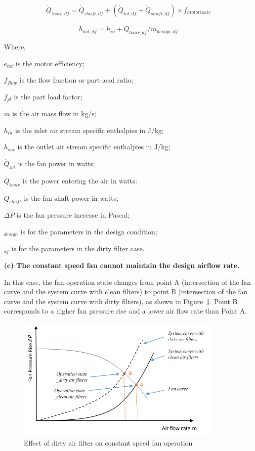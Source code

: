\begin{equation}
\dot{Q}_{toair,df} = \dot{Q}_{shaft,df} +( \dot{Q}_{tot,df} - \dot{Q}_{shaft,df}) \times f_{motortoair}
\end{equation}

\begin{equation}
h_{out,df} = h_{in} + \dot{Q}_{toair,df} / m_{design,df}
\end{equation}

Where,

\(e_{tot}\) is the motor efficiency;

\(f_{flow}\) is the flow fraction or part-load ratio;

\(f_{pl}\) is the part load factor;

\(m\) is the air mass flow in kg/s;

\(h_{in}\) is the inlet air stream specific enthalpies in J/kg;

\(h_{out}\) is the outlet air stream specific enthalpies in J/kg;

\(\dot{Q}_{tot}\) is the fan power in watts;

\(\dot{Q}_{toair}\) is the power entering the air in watts;

\(\dot{Q}_{shaft}\) is the fan shaft power in watts;

\(\Delta P\) is the fan pressure increase in Pascal;

\(_{design}\) is for the parameters in the design condition;

\(_{df}\) is for the parameters in the dirty filter case.

\textbf{(c) The constant speed fan cannot maintain the design airflow rate.}

In this case, the fan operation state changes from point A (intersection of the fan curve and the system curve with clean filters) to point B (intersection of the fan curve and the system curve with dirty filters), as shown in Figure~\ref{fig:effect-of-dirty-air-filter-on-constant-speed}. Point B corresponds to a higher fan pressure rise and a lower air flow rate than Point A.

\begin{figure}[hbtp] %
\centering
\includegraphics[width=0.9\textwidth, height=0.9\textheight, keepaspectratio=true]{media/image8008.png}
\caption{Effect of dirty air filter on constant speed fan operation \protect \label{fig:effect-of-dirty-air-filter-on-constant-speed}}
\end{figure}

